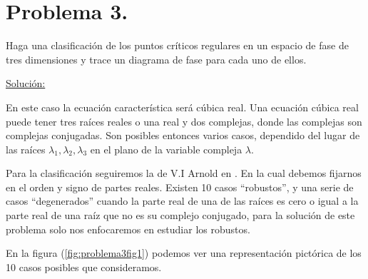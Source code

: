 \documentclass[a4paper,10pt]{article}
\numberwithin{equation}{section}
\begin{document}

\vspace{.3cm}

\newpage

\section{Problema 3.}

Haga una clasificación de los puntos críticos regulares en un espacio de fase 
de tres dimensiones y trace un diagrama de fase para cada uno de ellos.

\vspace{.3cm}

\underline{Solución:}\vspace{.3cm}

En este caso la ecuación característica será cúbica real. Una ecuación cúbica real puede
tener tres raíces reales o una real y dos complejas, donde las complejas son complejas conjugadas.
Son posibles entonces varios casos, dependido del lugar de las raíces $\lambda_1, \lambda_2, \lambda_3$
en el plano de la variable compleja $\lambda$.

\vspace{.3cm}

Para la clasificación seguiremos la de V.I Arnold en \cite{arnold}. En la cual debemos
fijarnos en el orden y signo de partes reales. Existen 10 casos ``robustos'', y una 
serie de casos ``degenerados'' cuando la parte real de una de las raíces es cero
o igual a la parte real de una raíz que no es su complejo conjugado, para la 
solución de este problema solo nos enfocaremos en estudiar los robustos. 

\vspace{.3cm}

En la figura (\ref{fig:problema3fig1}) podemos ver una representación pictórica de los
10 casos posibles que consideramos. 
\end{document}
